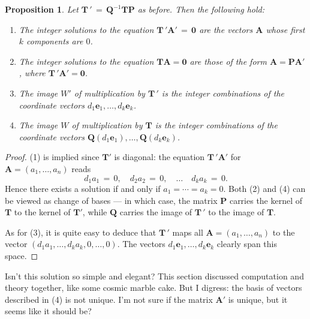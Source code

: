 \documentclass[11pt]{article}
\newtheorem{proposition}{Proposition}
\renewcommand{\vec}[1]{\mathbf{#1}}
\newcommand{\mat}[1]{\mathbf{#1}}
\begin{document}
\begin{adjustwidth}{0.5cm}{}
  \begin{proposition}
    Let $\mat{T} \, ' \, = \, \mat{Q}^{-1}\mat{T}\mat{P}$ as before. Then the following hold:
    \begin{enumerate}
      \item The integer solutions to the equation $\mat{T} \, ' \vec{A}' \, = \, \vec{0}$ are the vectors $\mat{A}$ whose first $k$ components are $0$.
      \item The integer solutions to the equation $\mat{T} \vec{A} = \vec{0}$ are those of the form $\mat{A} = \mat{P} \vec{A}'$, where $\mat{T} \, ' \vec{A}' = \vec{0}$.
      \item The image $W'$ of multiplication by $\mat{T} \,'$ is the integer combinations of the coordinate vectors $d_{1} \vec{e}_{1}, \ldots, d_{k} \vec{e}_{k}$.
      \item The image $W$ of multiplication by $\mat{T}$ is the integer combinations of the coordinate vectors $\mat{Q} (d_{1} \vec{e}_{1}), \ldots, \mat{Q} (d_{k} \vec{e}_{k})$.
    \end{enumerate}
  \end{proposition}
  \begin{proof}
    (1) is implied since $\mat{T}'$ is diagonal: the equation $\mat{T} \, ' \vec{A}'$ for $\vec{A} = (a_{1}, \ldots, a_{n})$ reads
    \[
      d_{1}a_{1} \, = \, 0, \quad d_{2}a_{2} \, = \, 0, \quad \ldots \quad d_{k}a_{k} \, = \, 0.
    \]
    Hence there exists a solution if and only if $a_{1} = \cdots = a_{k} = 0$. Both (2) and (4) can be viewed as change of bases --- in which case, the matrix $\mat{P}$ carries the kernel of $\mat{T}$ to the kernel of $\mat{T}'$, while $\mat{Q}$ carries the image of $\mat{T} \, '$ to the image of $\mat{T}$.

    As for (3), it is quite easy to deduce that $\mat{T} \, '$ maps all $\vec{A} = (a_{1}, \ldots, a_{n})$ to the vector $(d_{1}a_{1}, \ldots, d_{k}a_{k}, 0, \ldots, 0)$. The vectors $d_{1} \vec{e}_{1}, \ldots, d_{k} \vec{e}_{k}$ clearly span this space.
  \end{proof}
\end{adjustwidth}

Isn't this solution so simple and elegant? This section discussed computation and theory together, like some cosmic marble cake. But I digress: the basis of vectors described in (4) is not unique. I'm not sure if the matrix $\mat{A}'$ is unique, but it seems like it should be?
\end{document}
